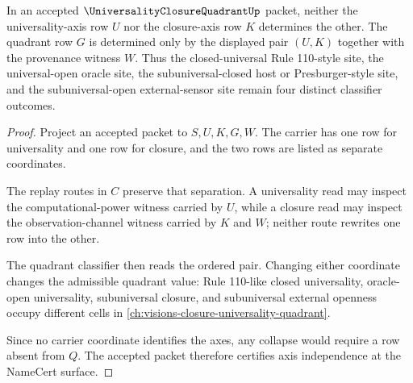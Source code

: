 \begin{theorem}
\label{thm:universality-closure-quadrant-axis-independence}
In an accepted $\UniversalityClosureQuadrantUp$ packet, neither the universality-axis row $U$ nor the closure-axis row $K$ determines the other. The quadrant row $G$ is determined only by the displayed pair $(U,K)$ together with the provenance witness $W$. Thus the closed-universal Rule 110-style site, the universal-open oracle site, the subuniversal-closed host or Presburger-style site, and the subuniversal-open external-sensor site remain four distinct classifier outcomes.
\end{theorem}
\begin{proof}
Project an accepted packet to $S,U,K,G,W$. The carrier has one row for universality and one row for closure, and the two rows are listed as separate coordinates.

The replay routes in $C$ preserve that separation. A universality read may inspect the computational-power witness carried by $U$, while a closure read may inspect the observation-channel witness carried by $K$ and $W$; neither route rewrites one row into the other.

The quadrant classifier then reads the ordered pair. Changing either coordinate changes the admissible quadrant value: Rule 110-like closed universality, oracle-open universality, subuniversal closure, and subuniversal external openness occupy different cells in \autoref{ch:visions-closure-universality-quadrant}.

Since no carrier coordinate identifies the axes, any collapse would require a row absent from $Q$. The accepted packet therefore certifies axis independence at the NameCert surface.
\end{proof}

